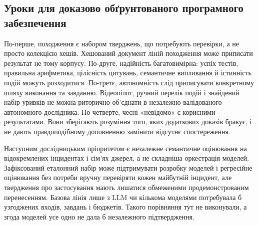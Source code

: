 \subsection{Уроки для доказово обґрунтованого програмного забезпечення}
По-перше, походження є набором тверджень, що потребують перевірки, а не просто колекцією хешів. Хешований документ ліній походження може приписати результат не тому корпусу. По-друге, надійність багатовимірна: успіх тестів, правильна арифметика, цілісність цитувань, семантичне випливання й істинність подій можуть розходитися. По-третє, автономність слід приписувати конкретному шляху виконання та завданню. Відеопілот, ручний перелік подій і знайдений набір уривків не можна риторично об'єднати в незалежно валідованого автономного дослідника. По-четверте, чесні «невідомо» є корисними результатами. Вони зберігають розуміння того, яких додаткових доказів бракує, і не дають правдоподібному доповненню замінити відсутнє спостереження.

Наступним дослідницьким пріоритетом є незалежне семантичне оцінювання на відокремлених інцидентах і сім'ях джерел, а не складніша оркестрація моделей. Зафіксований еталонний набір може підтримувати розробку моделей і регресійне оцінювання без потреби вручну перевіряти кожен майбутній інцидент, але твердження про застосування мають лишатися обмеженими продемонстрованим перенесенням. Базова лінія лише з LLM чи кількома моделями потребувала б узгоджених входів, завдань і бюджетів. Такого порівняння тут не виконували, а згода моделей усе одно не дала б незалежного підтвердження.
